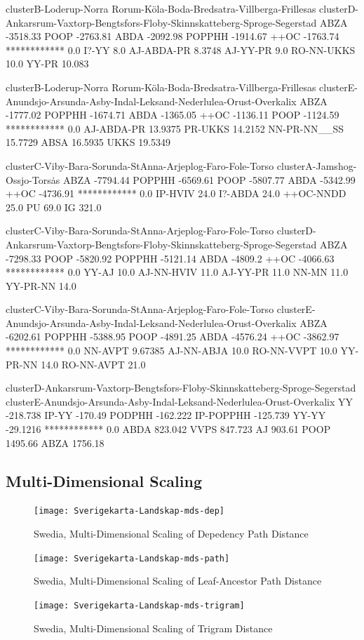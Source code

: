 clusterB-Loderup-Norra Rorum-K\"ola-Boda-Bredsatra-Villberga-Frillesas
clusterD-Ankarsrum-Vaxtorp-Bengtsfors-Floby-Skinnskatteberg-Sproge-Segerstad
ABZA -3518.33
POOP -2763.81
ABDA -2092.98
POPPHH -1914.67
++OC -1763.74
************ 0.0
I?-YY 8.0
AJ-ABDA-PR 8.3748
AJ-YY-PR 9.0
RO-NN-UKKS 10.0
YY-PR 10.083

clusterB-Loderup-Norra Rorum-K\"ola-Boda-Bredsatra-Villberga-Frillesas
clusterE-Anundsjo-Arsunda-Asby-Indal-Leksand-Nederlulea-Orust-Overkalix
ABZA -1777.02
POPPHH -1674.71
ABDA -1365.05
++OC -1136.11
POOP -1124.59
************ 0.0
AJ-ABDA-PR 13.9375
PR-UKKS 14.2152
NN-PR-NN\_\_SS 15.7729
ABSA 16.5935
UKKS 19.5349

clusterC-Viby-Bara-Sorunda-StAnna-Arjeplog-Faro-Fole-Torso
clusterA-Jamshog-Ossjo-Tors\.as
ABZA -7794.44
POPPHH -6569.61
POOP -5807.77
ABDA -5342.99
++OC -4736.91
************ 0.0
IP-HVIV 24.0
I?-ABDA 24.0
++OC-NNDD 25.0
PU 69.0
IG 321.0

clusterC-Viby-Bara-Sorunda-StAnna-Arjeplog-Faro-Fole-Torso
clusterD-Ankarsrum-Vaxtorp-Bengtsfors-Floby-Skinnskatteberg-Sproge-Segerstad
ABZA -7298.33
POOP -5820.92
POPPHH -5121.14
ABDA -4809.2
++OC -4066.63
************ 0.0
YY-AJ 10.0
AJ-NN-HVIV 11.0
AJ-YY-PR 11.0
NN-MN 11.0
YY-PR-NN 14.0

clusterC-Viby-Bara-Sorunda-StAnna-Arjeplog-Faro-Fole-Torso
clusterE-Anundsjo-Arsunda-Asby-Indal-Leksand-Nederlulea-Orust-Overkalix
ABZA -6202.61
POPPHH -5388.95
POOP -4891.25
ABDA -4576.24
++OC -3862.97
************ 0.0
NN-AVPT 9.67385
AJ-NN-ABJA 10.0
RO-NN-VVPT 10.0
YY-PR-NN 14.0
RO-NN-AVPT 21.0

clusterD-Ankarsrum-Vaxtorp-Bengtsfors-Floby-Skinnskatteberg-Sproge-Segerstad
clusterE-Anundsjo-Arsunda-Asby-Indal-Leksand-Nederlulea-Orust-Overkalix
YY -218.738
IP-YY -170.49
PODPHH -162.222
IP-POPPHH -125.739
YY-YY -29.1216
************ 0.0
ABDA 823.042
VVPS 847.723
AJ 903.61
POOP 1495.66
ABZA 1756.18
\subsection{Multi-Dimensional Scaling}
\begin{figure}
  \texttt{[image: Sverigekarta-Landskap-mds-dep]}
  \label{mds-dep}
  \caption{Swedia, Multi-Dimensional Scaling of Depedency Path Distance}
\end{figure}
\begin{figure}
  \texttt{[image: Sverigekarta-Landskap-mds-path]}
  \label{mds-path}
  \caption{Swedia, Multi-Dimensional Scaling of Leaf-Ancestor Path Distance}
\end{figure}
\begin{figure}
  \texttt{[image: Sverigekarta-Landskap-mds-trigram]}
  \label{mds-trigram}
  \caption{Swedia, Multi-Dimensional Scaling of Trigram Distance}
\end{figure}

